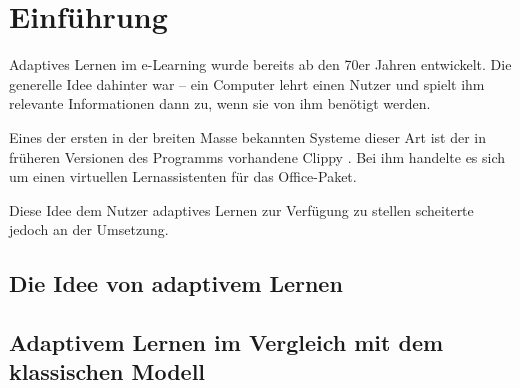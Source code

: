 \chapter{Einführung}

Adaptives Lernen im e-Learning wurde bereits
ab den 70er Jahren entwickelt. Die generelle Idee
dahinter war -- ein Computer lehrt einen Nutzer
und spielt ihm relevante Informationen dann zu,
wenn sie von ihm benötigt werden.

Eines der ersten in der breiten Masse bekannten
Systeme dieser Art ist der in früheren Versionen
des Programms vorhandene \glqq Clippy \grqq .
Bei ihm handelte es sich um einen virtuellen
Lernassistenten für das Office-Paket.

Diese Idee dem Nutzer adaptives Lernen zur Verfügung zu
stellen scheiterte jedoch an der Umsetzung.

\section{Die Idee von adaptivem Lernen}


\section{Adaptivem Lernen im Vergleich mit dem klassischen Modell}
